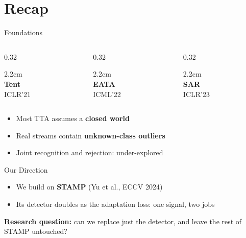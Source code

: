 \documentclass[aspectratio=169,10pt]{beamer}
\begin{document}
\section{Recap}
\begin{frame}{Foundations}
  \vspace{3mm}
  \begin{columns}[T]
    \begin{column}{0.32\textwidth}\begin{cardh}{2.2cm}\centering{}\\[1.5mm]{\rmfamily\bfseries\color{Navy}Tent}\\{\scriptsize\color{SubGray}ICLR'21}\end{cardh}\end{column}
    \begin{column}{0.32\textwidth}\begin{cardh}{2.2cm}\centering{}\\[1.5mm]{\rmfamily\bfseries\color{Navy}EATA}\\{\scriptsize\color{SubGray}ICML'22}\end{cardh}\end{column}
    \begin{column}{0.32\textwidth}\begin{cardh}{2.2cm}\centering{}\\[1.5mm]{\rmfamily\bfseries\color{Navy}SAR}\\{\scriptsize\color{SubGray}ICLR'23}\end{cardh}\end{column}
  \end{columns}
  \vspace{6mm}
  \vspace{3mm}
  \begin{itemize}
    \setlength\itemsep{2.5mm}
    \item Most TTA assumes a \textbf{closed world}
    \item Real streams contain \textbf{unknown-class outliers}
    \item Joint recognition and rejection: under-explored
  \end{itemize}
\end{frame}

\begin{frame}{Our Direction}
  \begin{itemize}
    \setlength\itemsep{4mm}
    \item We build on \textbf{\color{Navy}STAMP} (Yu et al., ECCV 2024)
    \item Its detector doubles as the adaptation loss: one signal, two jobs
  \end{itemize}
  \vspace{6mm}
  \begin{card}
    \centering\sffamily\color{Navy}
    \textbf{Research question:} can we replace just the detector, and leave the rest of STAMP untouched?
  \end{card}
\end{frame}
\end{document}

